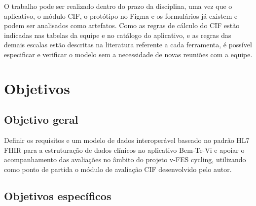 O trabalho pode ser realizado dentro do prazo da disciplina, uma vez que o aplicativo, o módulo CIF, o protótipo no
  Figma e os formulários já existem e podem ser analisados como artefatos. Como as regras de cálculo do CIF
  estão indicadas nas tabelas da equipe e no catálogo do aplicativo, e as regras das demais escalas estão descritas na
  literatura referente a cada ferramenta, é possível especificar e verificar o modelo sem a necessidade de novas reuniões
  com a equipe.



\section{Objetivos}

\subsection{Objetivo geral}

Definir os requisitos e um modelo de dados interoperável baseado no padrão HL7 FHIR para a estruturação
de dados clínicos no aplicativo Bem-Te-Vi e apoiar o acompanhamento das avaliações no âmbito do projeto v-FES cycling, utilizando como ponto de partida
o módulo de avaliação CIF desenvolvido pelo autor.

\subsection{Objetivos específicos}

